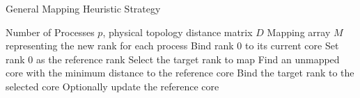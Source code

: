 \begin{algorithm}
    \caption{General Mapping Heuristic Strategy}
    \label{alg:toporr-strat}
    \begin{algorithmic}[1]
        \Require Number of Processes $p$, physical topology distance matrix $D$
        \Ensure  Mapping array $M$ representing the new rank for each process
        \State Bind rank 0 to its current core
        \State Set rank 0 as the reference rank
            \State Select the target rank to map
            \State Find an unmapped core with the minimum distance to the reference core  
            \State Bind the target rank to the selected core
            \State Optionally update the reference core
        \EndWhile
    \end{algorithmic}
\end{algorithm}